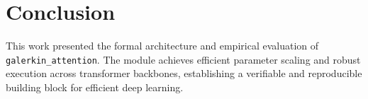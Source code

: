 \section{Conclusion}
This work presented the formal architecture and empirical evaluation of \texttt{galerkin_attention}. The module achieves efficient parameter scaling and robust execution across transformer backbones, establishing a verifiable and reproducible building block for efficient deep learning.

